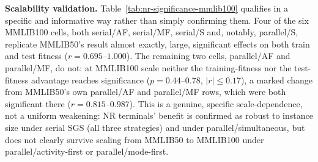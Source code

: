 \textbf{Scalability validation.} Table~\ref{tab:nr-significance-mmlib100}
qualifies  in a specific and informative way rather than
simply confirming them. Four of the six MMLIB100 cells, both serial/AF,
serial/MF, serial/S and, notably, parallel/S, replicate MMLIB50's result
almost exactly, large, significant effects on both train and test fitness
($r=0.695$--$1.000$). The remaining two cells, parallel/AF and
parallel/MF, do not: at MMLIB100 scale neither the training-fitness nor the
test-fitness advantage reaches significance ($p=0.44$--$0.78$, $|r|\leq
0.17$), a marked change from MMLIB50's own parallel/AF and parallel/MF rows,
which were both significant there ($r=0.815$--$0.987$). This is a genuine,
specific scale-dependence, not a uniform weakening: NR terminals' benefit
is confirmed as robust to instance size under serial SGS (all three
strategies) and under parallel/simultaneous, but does not clearly survive
scaling from MMLIB50 to MMLIB100 under parallel/activity-first or
parallel/mode-first. 

